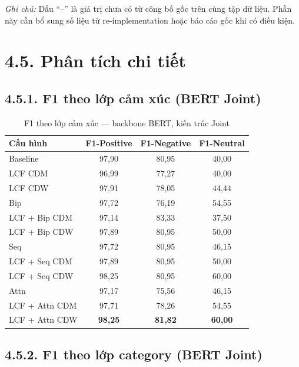 \textit{Ghi chú:} Dấu ``--'' là giá trị chưa có từ công bố gốc trên
cùng tập dữ liệu. Phần này cần bổ sung số liệu từ re-implementation
hoặc báo cáo gốc khi có điều kiện.

\section{4.5.\; Phân tích chi tiết}
\label{sec:analysis}

\subsection{4.5.1.\; F1 theo lớp cảm xúc (BERT Joint)}

\begin{table}[H]
\centering
\small
\caption{F1 theo lớp cảm xúc — backbone BERT, kiến trúc Joint}
\label{tab:sentiment_perclass}
\begin{tabular}{@{}lccc@{}}
\toprule
\textbf{Cấu hình} & \textbf{F1-Positive} & \textbf{F1-Negative} & \textbf{F1-Neutral} \\
\midrule
Baseline               & 97,90 & 80,95 & 40,00 \\
LCF CDM                & 96,99 & 77,27 & 40,00 \\
LCF CDW                & 97,91 & 78,05 & 44,44 \\
Bip                    & 97,72 & 76,19 & 54,55 \\
LCF + Bip CDM          & 97,14 & 83,33 & 37,50 \\
LCF + Bip CDW          & 97,89 & 80,95 & 50,00 \\
Seq                    & 97,72 & 80,95 & 46,15 \\
LCF + Seq CDM          & 97,89 & 80,95 & 50,00 \\
LCF + Seq CDW          & 98,25 & 80,95 & 60,00 \\
Attn                   & 97,17 & 75,56 & 46,15 \\
LCF + Attn CDM         & 97,71 & 78,26 & 54,55 \\
LCF + Attn CDW         & \textbf{98,25} & \textbf{81,82} & \textbf{60,00} \\
\bottomrule
\end{tabular}
\end{table}

\subsection{4.5.2.\; F1 theo lớp category (BERT Joint)}

